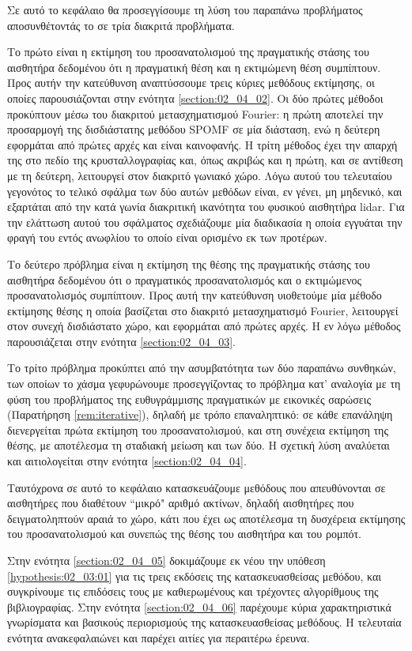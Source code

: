 Σε αυτό το κεφάλαιο θα προσεγγίσουμε τη λύση του παραπάνω προβλήματος
αποσυνθέτοντάς το σε τρία διακριτά προβλήματα.

Το πρώτο είναι η εκτίμηση του προσανατολισμού της πραγματικής στάσης του
αισθητήρα δεδομένου ότι η πραγματική θέση και η εκτιμώμενη θέση συμπίπτουν.
Προς αυτήν την κατεύθυνση αναπτύσσουμε τρεις κύριες μεθόδους εκτίμησης, οι
οποίες παρουσιάζονται στην ενότητα \ref{section:02_04_02}. Οι δύο πρώτες
μέθοδοι προκύπτουν μέσω του διακριτού μετασχηματισμού Fourier: η πρώτη αποτελεί
την προσαρμογή της δισδιάστατης μεθόδου SPOMF σε μία διάσταση, ενώ η δεύτερη
εφορμάται από πρώτες αρχές και είναι καινοφανής. Η τρίτη μέθοδος έχει την
απαρχή της στο πεδίο της κρυσταλλογραφίας και, όπως ακριβώς και η πρώτη, και σε
αντίθεση με τη δεύτερη, λειτουργεί στον διακριτό γωνιακό χώρο. Λόγω αυτού του
τελευταίου γεγονότος το τελικό σφάλμα των δύο αυτών μεθόδων είναι, εν γένει, μη
μηδενικό, και εξαρτάται από την κατά γωνία διακριτική ικανότητα του φυσικού
αισθητήρα lidar. Για την ελάττωση αυτού του σφάλματος σχεδιάζουμε μία
διαδικασία η οποία εγγυάται την φραγή του εντός ανωφλίου το οποίο είναι
ορισμένο εκ των προτέρων.

Το δεύτερο πρόβλημα είναι η εκτίμηση της θέσης της πραγματικής στάσης του
αισθητήρα δεδομένου ότι ο πραγματικός προσανατολισμός και ο εκτιμώμενος
προσανατολισμός συμπίπτουν. Προς αυτή την κατεύθυνση υιοθετούμε μία μέθοδο
εκτίμησης θέσης η οποία βασίζεται στο διακριτό μετασχηματισμό Fourier,
λειτουργεί στον συνεχή δισδιάστατο χώρο, και εφορμάται από πρώτες αρχές. Η εν
λόγω μέθοδος παρουσιάζεται στην ενότητα \ref{section:02_04_03}.

Το τρίτο πρόβλημα προκύπτει από την ασυμβατότητα των δύο παραπάνω συνθηκών, των
οποίων το χάσμα γεφυρώνουμε προσεγγίζοντας το πρόβλημα
κατ' αναλογία με τη φύση του προβλήματος της ευθυγράμμισης πραγματικών με
εικονικές σαρώσεις (Παρατήρηση \ref{rem:iterative}), δηλαδή με τρόπο
επαναληπτικό: σε κάθε επανάληψη διενεργείται πρώτα εκτίμηση του
προσανατολισμού, και στη συνέχεια εκτίμηση της θέσης, με αποτέλεσμα τη σταδιακή
μείωση και των δύο. Η σχετική λύση αναλύεται και αιτιολογείται στην ενότητα
\ref{section:02_04_04}.

Ταυτόχρονα σε αυτό το κεφάλαιο κατασκευάζουμε μεθόδους που απευθύνονται σε
αισθητήρες που διαθέτουν ``μικρό" αριθμό ακτίνων, δηλαδή αισθητήρες που
δειγματοληπτούν αραιά το χώρο, κάτι που έχει ως αποτέλεσμα τη δυσχέρεια
εκτίμησης του προσανατολισμού και συνεπώς της θέσης του αισθητήρα και του
ρομπότ.

Στην ενότητα \ref{section:02_04_05} δοκιμάζουμε εκ νέου την υπόθεση
\ref{hypothesis:02_03:01} για τις τρεις εκδόσεις της κατασκευασθείσας μεθόδου,
και συγκρίνουμε τις επιδόσεις τους με καθιερωμένους και τρέχοντες αλγορίθμους
της βιβλιογραφίας. Στην ενότητα \ref{section:02_04_06} παρέχουμε κύρια
χαρακτηριστικά γνωρίσματα και βασικούς περιορισμούς της κατασκευασθείσας
μεθόδους. Η τελευταία ενότητα ανακεφαλαιώνει και παρέχει αιτίες για περαιτέρω
έρευνα.
